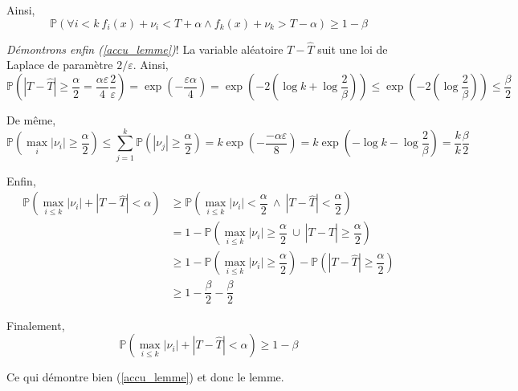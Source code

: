 Ainsi,
\[
    \mathbb P \left( \forall i < k \  f_i(x) + \nu_i < T + \alpha \wedge f_k(x) + \nu_k > T - \alpha \right) \geq 1 - \beta
\]

\textit{Démontrons enfin (\ref{accu_lemme})}! La variable aléatoire \(T-\hat T\) suit une loi de {\sc Laplace} de paramètre \(2/\varepsilon\). Ainsi,
\[
    \mathbb P \left( |T - \hat T| \geq \dfrac{\alpha}{2} = \dfrac{\alpha \varepsilon}{4}\dfrac{2}{\varepsilon} \right) = \exp\left( -\dfrac{\varepsilon \alpha}{4} \right) = \exp\left( -2\left( \log k + \log \dfrac{2}{\beta} \right) \right) \leq \exp\left( -2\left(\log \dfrac{2}{\beta} \right) \right) \leq \dfrac{\beta}{2}
\]

De même,
\[
    \mathbb P \left( \max_{i} |\nu_i| \geq \dfrac{\alpha}{2} \right) \leq \sum\limits_{j = 1}^k \mathbb P \left( |\nu_j| \geq \dfrac{\alpha}{2} \right) = k \exp\left( -\dfrac{-\alpha\varepsilon}{8} \right) = k \exp\left( -\log k - \log\dfrac{2}{\beta} \right) = \dfrac{k}{k} \dfrac{\beta}{2}
\]

Enfin, 
\begin{align*}
    \mathbb P\left( \max_{i \leq k} |\nu_i| + |T - \hat T| < \alpha  \right) & \geq \mathbb P\left( \max_{i \leq k} |\nu_i| < \dfrac{\alpha}{2} \ \wedge \ |T - \hat T| < \dfrac{\alpha}{2} \right)\\
    & = 1 - \mathbb P\left( \max_{i \leq k} |\nu_i| \geq \dfrac{\alpha}{2} \ \cup \ |T - \hat T| \geq \dfrac{\alpha}{2} \right)\\
    & \geq 1 - \mathbb P\left( \max_{i \leq k} |\nu_i| \geq \dfrac{\alpha}{2}\right) - \mathbb P \left(|T - \hat T| \geq \dfrac{\alpha}{2} \right)\\
    &\geq 1 - \dfrac{\beta}{2} - \dfrac{\beta}{2}
\end{align*}

Finalement, 
\[
    \mathbb P\left( \max_{i \leq k} |\nu_i| + |T - \hat T| < \alpha  \right)  \geq 1 - \beta
\]

Ce qui démontre bien (\ref{accu_lemme}) et donc le lemme.\\


\newpage
\printbibliography


 